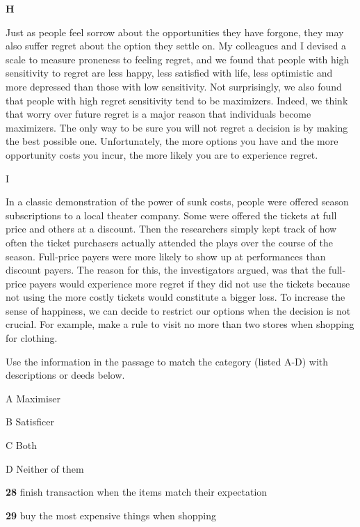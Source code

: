 \documentclass{../templateReading/cdreading}
\begin{document}
\textbf{H}\par

Just as people feel sorrow about the opportunities they have forgone, they may also suffer regret about the option they settle on. My colleagues and I devised a scale to measure proneness to feeling regret, and we found that people with high sensitivity to regret are less happy, less satisfied with life, less optimistic and more depressed than those with low sensitivity. Not surprisingly, we also found that people with high regret sensitivity tend to be maximizers. Indeed, we think that worry over future regret is a major reason that individuals become maximizers. The only way to be sure you will not regret a decision is by making the best possible one. Unfortunately, the more options you have and the more opportunity costs you incur, the more likely you are to experience regret.

I

In a classic demonstration of the power of sunk costs, people were offered season subscriptions to a local theater company. Some were offered the tickets at full price and others at a discount. Then the researchers simply kept track of how often the ticket purchasers actually attended the plays over the course of the season. Full-price payers were more likely to show up at performances than discount payers. The reason for this, the investigators argued, was that the full-price payers would experience more regret if they did not use the tickets because not using the more costly tickets would constitute a bigger loss. To increase the sense of happiness, we can decide to restrict our options when the decision is not crucial. For example, make a rule to visit no more than two stores when shopping for clothing.


Use the information in the passage to match the category (listed A-D) with descriptions or deeds below.


A     Maximiser

B     Satisficer

C     Both

D     Neither of them

\textbf{28} finish transaction when the items match their expectation

\textbf{29} buy the most expensive things when shopping
\end{document}
